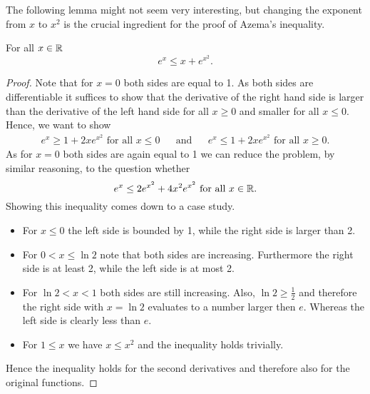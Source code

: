 		
		
The following lemma might not seem very interesting, but changing the exponent from $x$ to $x^2$ is the crucial ingredient for the proof of Azema's inequality.
\begin{lemma}\label{lem:exToex2} For all $x\in\mathbb{R}$
	\[e^{x}\leq x+e^{x^2}.\]
\end{lemma} 
\begin{proof}
	Note that for $x=0$ both sides are equal to 1. As both sides are differentiable it suffices to show that the derivative of the right hand side is larger than the derivative of the left hand side for all $x\geq0$ and smaller for all $x\leq0$. Hence, we want to show
	\begin{align*}
		e^x\geq 1+2xe^{x^2}\text{ for all $x\leq 0$} &   & \text{and} &   & e^x\leq 1+2xe^{x^2}\text{ for all $x\geq 0$}. 
	\end{align*}
	As for $x=0$ both sides are again equal to 1 we can reduce the problem, by similar reasoning, to the question whether
	\[e^x\leq 2e^{x^2}+4x^2e^{x^2}\text{ for all $x\in\mathbb{R}$}.\]
	Showing this inequality comes down to a case study.
	\begin{itemize}
		\item For $x\leq0$ the left side is bounded by 1, while the right side is larger than 2.
		\item For $0<x\leq\ln 2$ note that both sides are increasing. Furthermore the right side is at least 2, while the left side is at most 2.
		\item For $\ln2<x<1$ both sides are still increasing. Also, $\ln2\geq\frac{1}{2}$ and therefore the right side with $x=\ln2$ evaluates to a number larger then $e$. Whereas the left side is clearly less than $e$.
		\item For $1\leq x$ we have $x\leq x^2$ and the inequality holds trivially.
	\end{itemize}
	Hence the inequality holds for the second derivatives  and therefore also for the original functions.
\end{proof}
		

